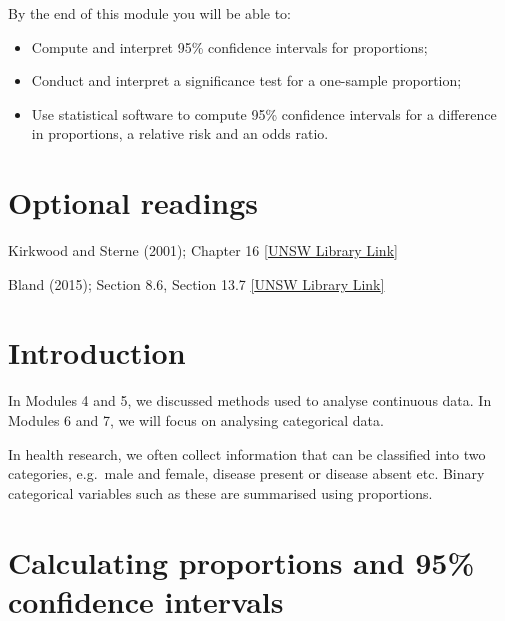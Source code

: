 \documentclass[
  a4paper,
]{memoir}
\providecommand{\tightlist}{%
  \setlength{\itemsep}{0pt}\setlength{\parskip}{0pt}}
\begin{document}

By the end of this module you will be able to:

\begin{itemize}
\tightlist
\item
  Compute and interpret 95\% confidence intervals for proportions;
\item
  Conduct and interpret a significance test for a one-sample proportion;
\item
  Use statistical software to compute 95\% confidence intervals for a
  difference in proportions, a relative risk and an odds ratio.
\end{itemize}

\section*{Optional readings}\label{optional-readings-5}


Kirkwood and Sterne (2001); Chapter 16
\href{http://er1.library.unsw.edu.au/er/cgi-bin/eraccess.cgi?url=https://ebookcentral.proquest.com/lib/unsw/detail.action?docID=624728}{{[}UNSW
Library Link{]}}

Bland (2015); Section 8.6, Section 13.7
\href{http://er1.library.unsw.edu.au/er/cgi-bin/eraccess.cgi?url=https://ebookcentral.proquest.com/lib/unsw/detail.action?docID=5891730}{{[}UNSW
Library Link{]}}

\section{Introduction}\label{introduction-5}

In Modules 4 and 5, we discussed methods used to analyse continuous
data. In Modules 6 and 7, we will focus on analysing categorical data.

In health research, we often collect information that can be classified
into two categories, e.g.~male and female, disease present or disease
absent etc. Binary categorical variables such as these are summarised
using proportions.

\section{Calculating proportions and 95\% confidence
intervals}\label{calculating-proportions-and-95-confidence-intervals}
\end{document}
